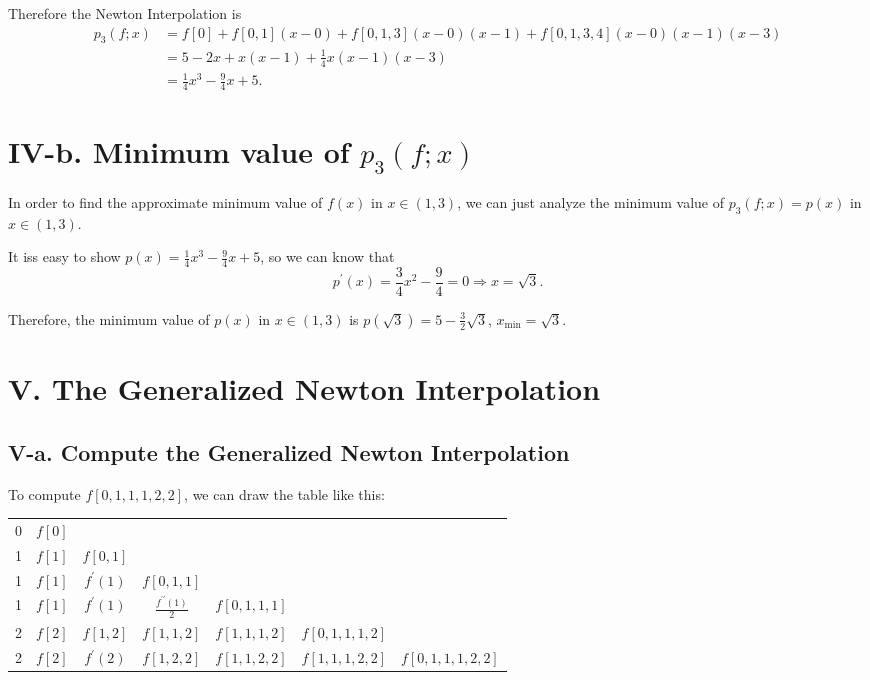 \documentclass[a4paper]{article}
\begin{document}
Therefore the Newton Interpolation is
\begin{equation}
  \begin{aligned}
    p_3(f;x) &= f[0] + f[0,1](x-0) + f[0,1,3](x-0)(x-1) + f[0,1,3,4](x-0)(x-1)(x-3) \\
             &= 5 - 2x + x(x-1) + \frac{1}{4}x(x-1)(x-3) \\
             &= \frac{1}{4}x^3 - \frac{9}{4}x + 5.
  \end{aligned}
\end{equation}

\section*{IV-b. Minimum value of $p_3(f;x)$}

In order to find the approximate minimum value of $f(x)$ in $x\in (1,3)$, we can just analyze the minimum value of $p_3(f;x) = p(x)$ in $x\in(1,3)$.

It iss easy to show $p(x) = \frac{1}{4}x^3 - \frac{9}{4}x + 5$, so we can know that 
\begin{equation}
  p^{\prime}(x) = \frac{3}{4}x^2 - \frac{9}{4} = 0 \Rightarrow x = \sqrt{3}.
\end{equation}

Therefore, the minimum value of $p(x)$ in $x\in(1,3)$ is $p(\sqrt{3}) = 5 - \frac{3}{2}\sqrt{3}$, $x_{\min} = \sqrt{3}$.

\section*{V. The Generalized Newton Interpolation}

\subsection*{V-a. Compute the Generalized Newton Interpolation}

To compute $f[0,1,1,1,2,2]$, we can draw the table like this:

\begin{table}[H]
  \centering
  \begin{tabular}{c|cccccc}
    0 & $f[0]$ &                 &                                  & & & \\
    1 & $f[1]$ & $f[0,1]$        &                                  & & & \\
    1 & $f[1]$ & $f^{\prime}(1)$ & $f[0,1,1]$                       & & & \\
    1 & $f[1]$ & $f^{\prime}(1)$ & $\frac{f^{\prime \prime}(1)}{2}$ & $f[0,1,1,1]$ & & \\
    2 & $f[2]$ & $f[1,2]$        & $f[1,1,2]$                       & $f[1,1,1,2]$ & $f[0,1,1,1,2]$ & \\
    2 & $f[2]$ & $f^{\prime}(2)$ & $f[1,2,2]$                       & $f[1,1,2,2]$ & $f[1,1,1,2,2]$ & $f[0,1,1,1,2,2]$ \\
  \end{tabular}
  \label{tabel::V-A.tabel1}
\end{table}
\end{document}
